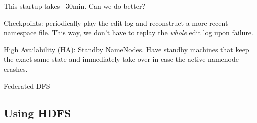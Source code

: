 \documentclass[11pt,oneside,a4paper]{article}
\begin{document}
This startup takes ~30min. Can we do better?

\begin{compactitem}
	\item Checkpoints: periodically play the edit log and reconstruct a more recent namespace file. This way, we don't have to replay the \textit{whole} edit log upon failure.
	\item High Availability (HA): Standby NameNodes. Have standby machines that keep the exact same state and immediately take over in case the active namenode crashes.
	\item Federated DFS
\end{compactitem}

\subsection{Using HDFS}





\titlespacing{\subsection}{0pt}{2ex}{2ex}

\label{lastpage} %
\clearpage
{}



\clearpage
\appendix
{}
\end{document}
